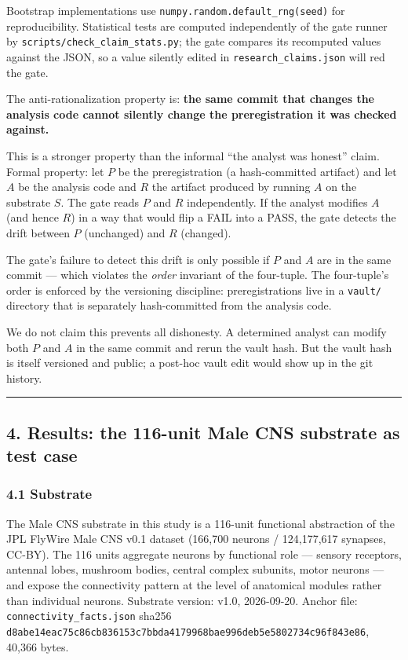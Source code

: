 \documentclass[
]{article}
\begin{document}
Bootstrap implementations use \texttt{numpy.random.default\_rng(seed)}
for reproducibility. Statistical tests are computed independently of the
gate runner by \texttt{scripts/check\_claim\_stats.py}; the gate
compares its recomputed values against the JSON, so a value silently
edited in \texttt{research\_claims.json} will red the gate.

The anti-rationalization property is: \textbf{the same commit that
changes the analysis code cannot silently change the preregistration it
was checked against.}

This is a stronger property than the informal ``the analyst was honest''
claim. Formal property: let \(P\) be the preregistration (a
hash-committed artifact) and let \(A\) be the analysis code and \(R\)
the artifact produced by running \(A\) on the substrate \(S\). The gate
reads \(P\) and \(R\) independently. If the analyst modifies \(A\) (and
hence \(R\)) in a way that would flip a FAIL into a PASS, the gate
detects the drift between \(P\) (unchanged) and \(R\) (changed).

The gate's failure to detect this drift is only possible if \(P\) and
\(A\) are in the same commit --- which violates the \emph{order}
invariant of the four-tuple. The four-tuple's order is enforced by the
versioning discipline: preregistrations live in a \texttt{vault/}
directory that is separately hash-committed from the analysis code.

We do not claim this prevents all dishonesty. A determined analyst can
modify both \(P\) and \(A\) in the same commit and rerun the vault hash.
But the vault hash is itself versioned and public; a post-hoc vault edit
would show up in the git history.

\begin{center}\rule{0.5\linewidth}{0.5pt}\end{center}

\subsection{4. Results: the 116-unit Male CNS substrate as test
case}\label{results-the-116-unit-male-cns-substrate-as-test-case}

\subsubsection{4.1 Substrate}\label{substrate}

The Male CNS substrate in this study is a 116-unit functional
abstraction of the JPL FlyWire Male CNS v0.1 dataset (166,700 neurons /
124,177,617 synapses, CC-BY). The 116 units aggregate neurons by
functional role --- sensory receptors, antennal lobes, mushroom bodies,
central complex subunits, motor neurons --- and expose the connectivity
pattern at the level of anatomical modules rather than individual
neurons. Substrate version: v1.0, 2026-09-20. Anchor file:
\texttt{connectivity\_facts.json} sha256
\texttt{d8abe14eac75c86cb836153c7bbda4179968bae996deb5e5802734c96f843e86},
40,366 bytes.
\end{document}
